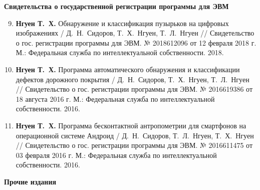 \noindent\textbf{Свидетельства о государственной регистрации программы для ЭВМ}

\begin{enumerate}[label=\arabic*.]\setcounter{enumi}{8}
\item \textbf{Нгуен Т.~Х.} Обнаружение и классификация пузырьков на цифровых изображениях / Д.~Н.~Сидоров, Т.~Х.~Нгуен, Т.~Л.~Нгуен // Свидетельство о гос. регистрации программы для ЭВМ. № 2018612096 от 12 февраля 2018 г. М.: Федеральная служба по интеллектуальной собственности. 2018.

\item\textbf{Нгуен Т.~Х.} Программа автоматического обнаружения и классификации дефектов дорожного покрытия / Д.~Н.~Сидоров, Т.~Х.~Нгуен, Т.~Л.~Нгуен // Свидетельство о гос. регистрации программы для ЭВМ. № 2016619386 от 18 августа 2016 г. М.: Федеральная служба по интеллектуальной собственности. 2016.

\item\textbf{Нгуен Т.~Х.} Программа бесконтактной антропометрии для смартфонов на операционной системе Андроид / Д.~Н.~Сидоров, Т.~Л.~Нгуен, Т.~Х.~Нгуен // Свидетельство о гос. регистрации программы для ЭВМ. № 2016611475 от 03 февраля 2016 г. М.: Федеральная служба по интеллектуальной собственности. 2016.
\end{enumerate}

\noindent\textbf{Прочие издания}

